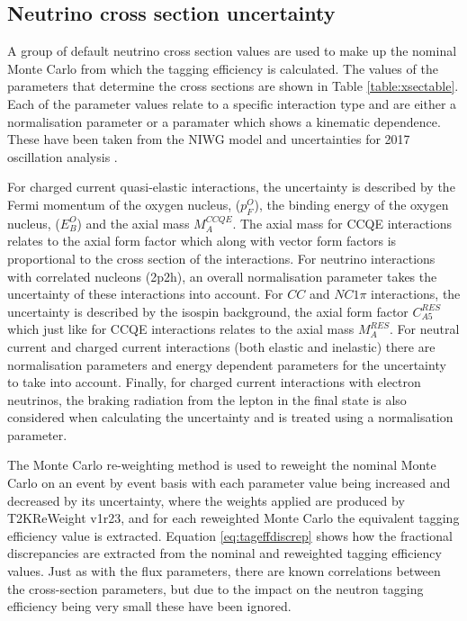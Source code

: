 \subsection{Neutrino cross section uncertainty}

A group of default neutrino cross section values are used to make up the nominal Monte Carlo from which the tagging efficiency is calculated. The values of the parameters that determine the cross sections are shown in Table \ref{table:xsectable}. Each of the parameter values relate to a specific interaction type and are either a normalisation parameter or a paramater which shows a kinematic dependence. These have been taken from the NIWG model and uncertainties for 2017 oscillation analysis \cite{NIWG_xsec}. \newline

For charged current quasi-elastic interactions, the uncertainty is described by the Fermi momentum of the oxygen nucleus, ($p_{F}^{O}$), the binding energy of the oxygen nucleus, ($E_{B}^{O}$) and the axial mass $M_{A}^{C C Q E}$. The axial mass for CCQE interactions relates to the axial form factor which along with vector form factors is proportional to the cross section of the interactions. For neutrino interactions with correlated nucleons (2p2h), an overall normalisation parameter takes the uncertainty of these interactions into account. For $CC$ and $NC1\pi$ interactions, the uncertainty is described by the isospin background, the axial form factor $C_{A 5}^{R E S}$ which just like for CCQE interactions relates to the axial mass $M_{A}^{R E S}$. For neutral current and charged current interactions (both elastic and inelastic) there are normalisation parameters and energy dependent parameters for the uncertainty to take into account. Finally, for charged current interactions with electron neutrinos, the braking radiation from the lepton in the final state is also considered when calculating the uncertainty and is treated using a normalisation parameter.
\newline

The Monte Carlo re-weighting method is used to reweight the nominal Monte Carlo on an event by event basis with each parameter value being increased and decreased by its uncertainty, where the weights applied are produced by T2KReWeight v1r23, and for each reweighted Monte Carlo the equivalent tagging efficiency value is extracted. Equation \ref{eq:tageffdiscrep} shows how the fractional discrepancies are extracted from the nominal and reweighted tagging efficiency values. Just as with the flux parameters, there are known correlations between the cross-section parameters, but due to the impact on the neutron tagging efficiency being very small these have been ignored. 


